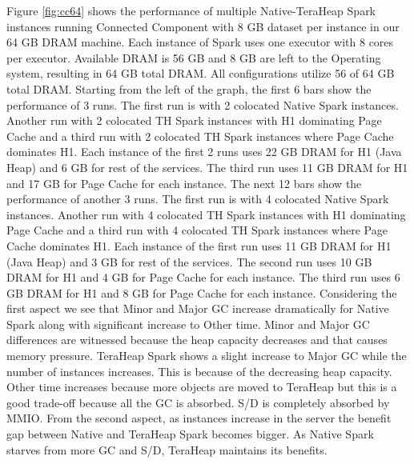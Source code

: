 Figure \ref{fig:cc64} shows the performance of multiple
Native-TeraHeap Spark instances running Connected Component with 8 GB
dataset per instance in our 64 GB DRAM machine. Each instance of Spark
uses one executor with 8 cores per executor. Available DRAM is 56 GB
and 8 GB are left to the Operating system, resulting in 64 GB total
DRAM. All configurations utilize 56 of 64 GB total DRAM.
Starting from the left of the graph, the first 6 bars show the
performance of 3 runs. The first run is with 2 colocated Native Spark instances.
Another run with 2 colocated TH Spark instances with H1 dominating Page Cache
and a third run with 2 colocated TH Spark instances where Page Cache dominates H1.
Each instance of the first 2 runs uses 22 GB DRAM for H1 (Java Heap) and 6 GB for rest of the services.
The third run uses 11 GB DRAM for H1 and 17 GB for Page Cache for each instance. 
The next 12 bars show the performance of another 3 runs. The first run is with 4 colocated Native Spark instances.
Another run with 4 colocated TH Spark instances with H1 dominating Page Cache
and a third run with 4 colocated TH Spark instances where Page Cache dominates H1.
Each instance of the first run uses 11 GB DRAM for H1 (Java Heap) and 3 GB for rest of the services.
The second run uses 10 GB DRAM for H1 and 4 GB for Page Cache for each instance.
The third run uses 6 GB DRAM for H1 and 8 GB for Page Cache for each instance.
Considering the first aspect we see that Minor and Major GC increase dramatically for Native Spark along with significant increase to Other time. Minor and Major GC differences are witnessed because the heap capacity decreases and that causes memory pressure. TeraHeap Spark shows a slight increase to Major GC while the number of instances increases. This is because of the decreasing heap capacity. Other time increases because more objects are moved to TeraHeap but this is a good trade-off because all the GC is absorbed. S/D is completely absorbed by MMIO. From the second aspect, as instances increase in the server the benefit gap between Native and TeraHeap Spark becomes bigger. As Native Spark starves from more GC and S/D, TeraHeap maintains its benefits.

